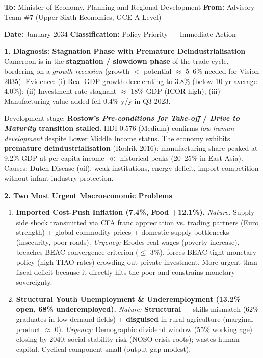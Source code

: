 \documentclass[11pt]{article}
\begin{document}
\begin{exemplebox}
\textbf{To:} Minister of Economy, Planning and Regional Development \hfill \textbf{From:} Advisory Team \#7 (Upper Sixth Economics, GCE A-Level)
\par\medskip\noindent
\textbf{Date:} January 2034 \hfill \textbf{Classification:} Policy Priority — Immediate Action

\textbf{1. Diagnosis: Stagnation Phase with Premature Deindustrialisation}
Cameroon is in the \textbf{stagnation / slowdown phase} of the trade cycle, bordering on a \emph{growth recession} (growth $<$ potential $\approx$ 5--6\% needed for Vision 2035). Evidence: (i) Real GDP growth decelerating to 3.8\% (below 10-yr average 4.0\%); (ii) Investment rate stagnant $\approx$ 18\% GDP (ICOR high); (iii) Manufacturing value added fell 0.4\% y/y in Q3 2023.
\par
Development stage: \textbf{Rostow's \emph{Pre-conditions for Take-off} / \emph{Drive to Maturity} transition stalled}. HDI 0.576 (Medium) confirms \emph{low human development} despite Lower Middle Income status. The economy exhibits \textbf{premature deindustrialisation} (Rodrik 2016): manufacturing share peaked at 9.2\% GDP at per capita income $\ll$ historical peaks (20--25\% in East Asia). Causes: Dutch Disease (oil), weak institutions, energy deficit, import competition without infant industry protection.

\textbf{2. Two Most Urgent Macroeconomic Problems}
\begin{enumerate}
    \item \textbf{Imported Cost-Push Inflation (7.4\%, Food +12.1\%).} \emph{Nature:} Supply-side shock transmitted via CFA franc appreciation vs. trading partners (Euro strength) + global commodity prices + domestic supply bottlenecks (insecurity, poor roads). \emph{Urgency:} Erodes real wages (poverty increase), breaches BEAC convergence criterion ($\le$ 3\%), forces BEAC tight monetary policy (high TIAO rates) crowding out private investment. More urgent than fiscal deficit because it directly hits the poor and constrains monetary sovereignty.
    \item \textbf{Structural Youth Unemployment \& Underemployment (13.2\% open, 68\% underemployed).} \emph{Nature:} \textbf{Structural} — skills mismatch (62\% graduates in low-demand fields) + \textbf{disguised} in rural agriculture (marginal product $\approx$ 0). \emph{Urgency:} Demographic dividend window (55\% working age) closing by 2040; social stability risk (NOSO crisis roots); wastes human capital. Cyclical component small (output gap modest).
\end{enumerate}


\end{exemplebox}
\end{document}
